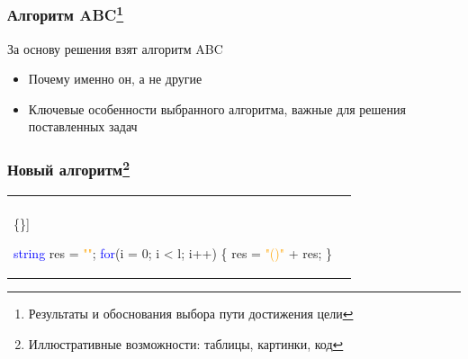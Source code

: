 \documentclass{beamer}
\begin{document}

\begin{frame}
  \frametitle{Алгоритм ABC\footnote{Результаты и обоснования выбора пути достижения цели}}
  За основу решения взят алгоритм ABC
  \begin{itemize}
    \item Почему именно он, а не другие
    \item Ключевые особенности выбранного алгоритма, важные для решения поставленных задач
  \end{itemize}
\end{frame}


\begin{frame}[fragile]
  \frametitle{Новый алгоритм\footnote{Иллюстративные возможности: таблицы, картинки, код}}
  \begin{tabular}{p{5cm} p{7cm}}
    \begin{minipage}{3in}
      \begin{Verbatim}[commandchars=\\\{\}]

        \textcolor{blue}{string} res = \textcolor{orange}{""};
        \textcolor{blue}{for}(i = 0; i < l; i++) \{
        res = \textcolor{orange}{"()"} + res;
        \}


\end{Verbatim}
\end{minipage}
\end{tabular}
\end{frame}
\end{document}
